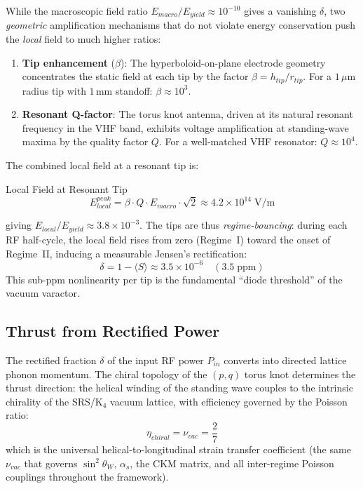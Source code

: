 While the macroscopic field ratio $E_{macro}/E_{yield} \approx 10^{-10}$ gives a vanishing $\delta$, two \textit{geometric} amplification mechanisms that do not violate energy conservation push the \textit{local} field to much higher ratios:
\begin{enumerate}
    \item \textbf{Tip enhancement} ($\beta$): The hyperboloid-on-plane electrode geometry concentrates the static field at each tip by the factor $\beta = h_{tip}/r_{tip}$. For a $1\,\mu$m radius tip with $1\,$mm standoff: $\beta \approx 10^3$.
    \item \textbf{Resonant Q-factor}: The torus knot antenna, driven at its natural resonant frequency in the VHF band, exhibits voltage amplification at standing-wave maxima by the quality factor $Q$. For a well-matched VHF resonator: $Q \approx 10^4$.
\end{enumerate}
The combined local field at a resonant tip is:
\begin{resultbox}{Local Field at Resonant Tip}
\begin{equation}
    E_{local}^{peak} = \beta \cdot Q \cdot E_{macro} \cdot \sqrt{2} \approx 4.2 \times 10^{14} \;\text{V/m}
    \label{eq:e_local_peak}
\end{equation}
\end{resultbox}
giving $E_{local}/E_{yield} \approx 3.8 \times 10^{-3}$. The tips are thus \textit{regime-bouncing}: during each RF half-cycle, the local field rises from zero (Regime~I) toward the onset of Regime~II, inducing a measurable Jensen's rectification:
\begin{equation}
    \delta = 1 - \langle S \rangle \approx 3.5 \times 10^{-6} \quad (3.5 \;\text{ppm})
\end{equation}
This sub-ppm nonlinearity per tip is the fundamental ``diode threshold'' of the vacuum varactor.

\subsection{Thrust from Rectified Power}

The rectified fraction $\delta$ of the input RF power $P_{in}$ converts into directed lattice phonon momentum. The chiral topology of the $(p,q)$ torus knot determines the thrust direction: the helical winding of the standing wave couples to the intrinsic chirality of the SRS/K$_4$ vacuum lattice, with efficiency governed by the Poisson ratio:
\begin{equation}
    \eta_{chiral} = \nu_{vac} = \frac{2}{7}
\end{equation}
which is the universal helical-to-longitudinal strain transfer coefficient (the same $\nu_{vac}$ that governs $\sin^2\theta_W$, $\alpha_s$, the CKM matrix, and all inter-regime Poisson couplings throughout the framework).

